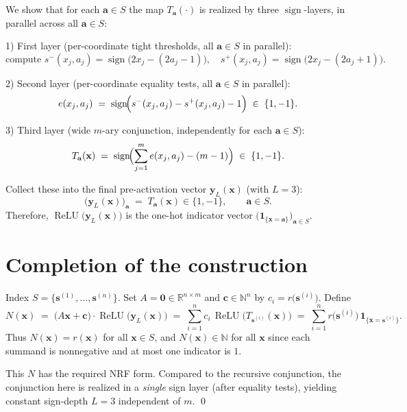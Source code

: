 \documentclass{article}
\newcommand{\sign}{\operatorname{sign}}
\newcommand{\relu}{\operatorname{ReLU}}
\newcommand{\NN}{\mathbb{N}}
\begin{document}
\begin{flushleft}
We show that for each $\mathbf{a}\in S$ the map $T_{\mathbf{a}}(\cdot)$ is realized by three $\sign$-layers, in parallel across all $\mathbf{a}\in S$:

1) First layer (per-coordinate tight thresholds, all $\mathbf{a}\in S$ in parallel):
\[
\text{compute } s^{-}(x_j,a_j)=\sign\!\bigl(2x_j-(2a_j-1)\bigr),\quad
s^{+}(x_j,a_j)=\sign\!\bigl(2x_j-(2a_j+1)\bigr).
\]

2) Second layer (per-coordinate equality tests, all $\mathbf{a}\in S$ in parallel):
\[
e(x_j,a_j)\;=\;\sign\!\Bigl(s^{-}(x_j,a_j)-s^{+}(x_j,a_j)-1\Bigr)\;\in\;\{1,-1\}.
\]

3) Third layer (wide $m$-ary conjunction, independently for each $\mathbf{a}\in S$):
\[
T_{\mathbf{a}}(\mathbf{x})\;=\;\sign\!\Bigl(\sum_{j=1}^m e(x_j,a_j)-(m-1)\Bigr)\;\in\;\{1,-1\}.
\]

Collect these into the final pre-activation vector $\mathbf{y}_L(\mathbf{x})$ (with $L=3$):
\[
\bigl(\mathbf{y}_L(\mathbf{x})\bigr)_{\mathbf{a}}\;=\;T_{\mathbf{a}}(\mathbf{x})\in\{1,-1\},\qquad \mathbf{a}\in S.
\]
Therefore, $\relu\bigl(\mathbf{y}_L(\mathbf{x})\bigr)$ is the one-hot indicator vector $\bigl(\mathbf{1}_{\{\mathbf{x}=\mathbf{a}\}}\bigr)_{\mathbf{a}\in S}$.
\end{flushleft}

\section{Completion of the construction}

\begin{flushleft}
Index $S=\{\mathbf{s}^{(1)},\dots,\mathbf{s}^{(n)}\}$. Set $A=\mathbf{0}\in\mathbb{R}^{n\times m}$ and $\mathbf{c}\in\NN^n$ by $c_i = r\bigl(\mathbf{s}^{(i)}\bigr)$. Define
\[
N(\mathbf{x}) \;=\; \bigl(A\mathbf{x}+\mathbf{c}\bigr)\cdot \relu\!\bigl(\mathbf{y}_L(\mathbf{x})\bigr)
\;=\; \sum_{i=1}^n c_i \,\relu\!\bigl( T_{\mathbf{s}^{(i)}}(\mathbf{x}) \bigr)
\;=\; \sum_{i=1}^n r\bigl(\mathbf{s}^{(i)}\bigr)\, \mathbf{1}_{\{\mathbf{x}=\mathbf{s}^{(i)}\}}.
\]
Thus $N(\mathbf{x})=r(\mathbf{x})$ for all $\mathbf{x}\in S$, and $N(\mathbf{x})\in\NN$ for all $\mathbf{x}$ since each summand is nonnegative and at most one indicator is $1$.

This $N$ has the required NRF form. Compared to the recursive conjunction, the conjunction here is realized in a \emph{single} sign layer (after equality tests), yielding constant sign-depth $L=3$ independent of $m$.
\qed
\end{flushleft}
\end{document}
